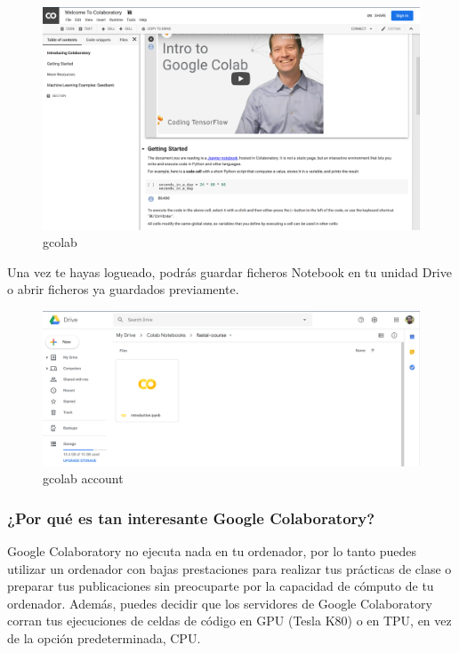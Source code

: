 \documentclass[11pt]{article}
\makeatletter
\def\maxwidth{\ifdim\Gin@nat@width>\linewidth\linewidth
    \else\Gin@nat@width\fi}
\let\Oldincludegraphics\includegraphics
\renewcommand{\includegraphics}[1]{\Oldincludegraphics[width=.8\maxwidth]{#1}}
\makeatother
\begin{document}
    \begin{figure}
\centering
\includegraphics{gcolab-intro.png}
\caption{gcolab}
\end{figure}

    Una vez te hayas logueado, podrás guardar ficheros Notebook en tu unidad
Drive o abrir ficheros ya guardados previamente.

    \begin{figure}
\centering
\includegraphics{gcolab-account.png}
\caption{gcolab account}
\end{figure}

    \subsubsection{¿Por qué es tan interesante Google
Colaboratory?}\label{por-quuxe9-es-tan-interesante-google-colaboratory}

    Google Colaboratory no ejecuta nada en tu ordenador, por lo tanto puedes
utilizar un ordenador con bajas prestaciones para realizar tus prácticas
de clase o preparar tus publicaciones sin preocuparte por la capacidad
de cómputo de tu ordenador. Además, puedes decidir que los servidores de
Google Colaboratory corran tus ejecuciones de celdas de código en GPU
(Tesla K80) o en TPU, en vez de la opción predeterminada, CPU.
\end{document}
